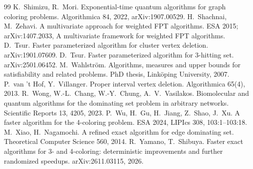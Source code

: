 \documentclass[11pt]{article}
\theoremstyle{remark}
\begin{document}
\begin{thebibliography}{99}
 K.~Shimizu, R.~Mori. Exponential-time quantum algorithms for graph coloring problems. Algorithmica 84, 2022, arXiv:1907.00529.
 H.~Shachnai, M.~Zehavi. A multivariate approach for weighted FPT algorithms. ESA 2015; arXiv:1407.2033, A multivariate framework for weighted FPT algorithms.
 D.~Tsur. Faster parameterized algorithm for cluster vertex deletion. arXiv:1901.07609.
 D.~Tsur. Faster parameterized algorithm for 3-hitting set. arXiv:2501.06452.
 M.~Wahlstr{\"o}m. Algorithms, measures and upper bounds for satisfiability and related problems. PhD thesis, Link{\"o}ping University, 2007.
 P.~van 't Hof, Y.~Villanger. Proper interval vertex deletion. Algorithmica 65(4), 2013.
 R.~Wong, W.-L.~Chang, W.-Y.~Chung, A.~V.~Vasilakos. Biomolecular and quantum algorithms for the dominating set problem in arbitrary networks. Scientific Reports 13, 4205, 2023.
 P.~Wu, H.~Gu, H.~Jiang, Z.~Shao, J.~Xu. A faster algorithm for the 4-coloring problem. ESA 2024, LIPIcs 308, 103:1--103:18.
 M.~Xiao, H.~Nagamochi. A refined exact algorithm for edge dominating set. Theoretical Computer Science 560, 2014.
 R.~Yamano, T.~Shibuya. Faster exact algorithms for 3- and 4-coloring: deterministic improvements and further randomized speedups. arXiv:2611.03115, 2026.
\end{thebibliography}
\end{document}

